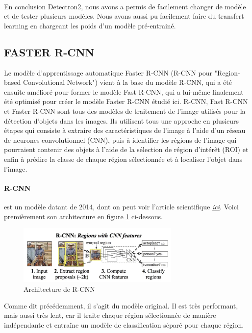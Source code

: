 \paragraph{}
En conclusion Detectron2, nous avons a permis de facilement changer de modèle et de tester plusieurs modèles. Nous avons aussi pu facilement faire du transfert learning en chargeant les poids d'un modèle pré-entrainé. 


\subsection{FASTER R-CNN}

Le modèle d'apprentissage automatique Faster R-CNN (R-CNN pour "Region-based Convolutional Network") vient à la base du modèle R-CNN, qui a été ensuite amélioré pour former le modèle Fast R-CNN, qui a lui-même finalement été optimisé pour créer le modèle Faster R-CNN étudié ici. R-CNN, Fast R-CNN et Faster R-CNN sont tous des modèles de traitement de l'image utilisés pour la détection d'objets dans les images. Ils utilisent tous une approche en plusieurs étapes qui consiste à extraire des caractéristiques de l'image à l'aide d'un réseau de neurones convolutionnel (CNN), puis à identifier les régions de l'image qui pourraient contenir des objets à l'aide de la sélection de région d'intérêt (ROI) et enfin à prédire la classe de chaque région sélectionnée et à localiser l'objet dans l'image.

\paragraph{R-CNN} est un modèle datant de 2014, dont on peut voir l'article scientifique \href{https://arxiv.org/pdf/1311.2524.pdf}{\textit{ici}}. Voici premièrement son architecture en figure \ref{fig:rcnn_architecture} ci-dessous.

\begin{figure}[H]
    \centering
    \includegraphics[width=300px]{images/model_rcnn_architecture.png}
    \caption{Architecture de R-CNN}
    \label{fig:rcnn_architecture}
\end{figure}

Comme dit précédemment, il s'agit du modèle original. Il est très performant, mais aussi très lent, car il traite chaque région sélectionnée de manière indépendante et entraîne un modèle de classification séparé pour chaque région.

